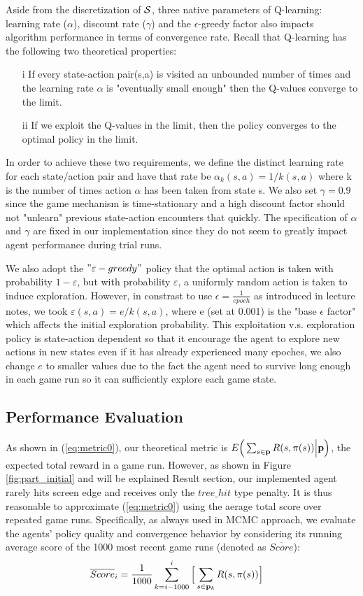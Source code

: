 \documentclass[11pt]{article}
\theoremstyle{definition}
\begin{document}
Aside from the discretization of ${\cal S}$, three native parameters of Q-learning: learning rate ($\alpha$), discount rate ($\gamma$) and the $\epsilon$-greedy factor also impacts algorithm performance in terms of convergence rate. Recall that Q-learning has the following two theoretical properties:
\begin{enumerate}
	\item [i] If every state-action pair(s,a) is visited an unbounded number of times and the learning rate $\alpha$ is "eventually small enough" then the Q-values converge to the limit.
	\item [ii] If we exploit the Q-values in the limit, then the policy converges to the optimal policy in the limit.
\end{enumerate}

In order to achieve these two requirements, we define the distinct learning rate for each state/action pair and have that rate be $\alpha_k(s,a)=1/k(s, a)$ where k is the number of times action $\alpha$ has been taken from state s. We also set $\gamma = 0.9$ since the game mechanism is time-stationary and a high discount factor should not "unlearn" previous state-action encounters that quickly. The specification of $\alpha$ and $\gamma$ are fixed in our implementation since they do not seem to greatly impact agent performance during trial runs.

We also adopt the $"\varepsilon-greedy"$ policy that the optimal action is taken with probability $1-\varepsilon$, but with probability $\varepsilon$, a uniformly random action is taken to induce exploration. However, in constrast to use $\epsilon = \frac{1}{epoch}$ as introduced in lecture notes, 
we took $\varepsilon(s, a)=e/k(s, a)$, where e (set at 0.001) is the "base $\epsilon$ factor" which affects the initial exploration probability. This exploitation v.s. exploration policy is state-action dependent so that it encourage the agent to explore new actions in new states even if it has already experienced many epoches, we also change $e$ to smaller values due to the fact the agent need to survive long enough in each game run so it can sufficiently explore each game state.

\subsection{\textbf{Performance Evaluation}}
As shown in (\ref{eq:metric0}), our theoretical metric is $E \Big( \sum_{s \in {\bf p}} R(s, \pi(s)) \Big| {\bf p} \Big)$, the expected total reward in a game run. However, as shown in Figure \ref{fig:part_initial} and will be explained Result section, our implemented agent rarely hits screen edge and receives only the $tree\_hit$ type penalty. It is thus reasonable to approximate (\ref{eq:metric0}) using the aerage total score over repeated game runs. Specifically, as always used in MCMC approach, we evaluate the agents' policy quality and convergence behavior by considering its running average score of the 1000 most recent game runs (denoted as $\overline{Score}$):
\begin{align*}
\overline{Score}_i &= \frac{1}{1000}\sum_{k=i-1000}^i \Big[  \sum_{s \in {\bf p}_k} R(s, \pi(s)) \Big]
\end{align*}
\end{document}

